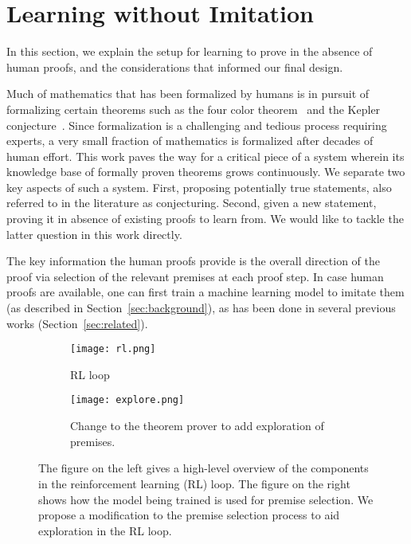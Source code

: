 \documentclass{article}
\begin{document}
\section{Learning without Imitation}
\label{sec:learning}

In this section, we explain the setup for learning to prove in the absence of human proofs, and the considerations that informed our final design.

Much of mathematics that has been formalized by humans is in pursuit of formalizing certain theorems such as the four color theorem~\citep{gonthier2008formal} and the Kepler conjecture~\citep{hales2017formal}.
Since formalization is a challenging and tedious process requiring experts, a very small fraction of mathematics is formalized after decades of human effort.
This work paves the way for a critical piece of a system
wherein its knowledge base of formally proven theorems grows continuously.
We separate two key aspects of such a system.
First, proposing potentially true statements, also referred to in the literature as conjecturing.
Second, given a new statement, proving it in absence of existing proofs to learn from.
We would like to tackle the latter question in this work directly.


The key information the human proofs provide is the overall
direction of the proof via selection of the relevant premises at each proof step.
In case human proofs are available, one can first train
a machine learning model to imitate them
(as described in Section~\ref{sec:background}), as has been done in several previous works (Section~\ref{sec:related}).
\begin{figure}
\begin{subfigure}[t]{0.23\textwidth}
    \texttt{[image: rl.png]}
    \caption{RL loop}
    \label{fig:rlloop}
\end{subfigure}
\hfill
\begin{subfigure}[t]{0.73\textwidth}
    \centering
    \texttt{[image: explore.png]}
    \caption{Change to the theorem prover to add exploration of premises.}
    \label{fig:explorepremises}
\end{subfigure}
\caption{The figure on the left gives a high-level overview of the components in the reinforcement learning (RL) loop. The figure on the right shows how the model being trained is used for premise selection. We propose a modification to the premise selection process to aid exploration in the RL loop.}
\label{fig:rloverview}
\vspace{-4mm}
\end{figure}
\end{document}
